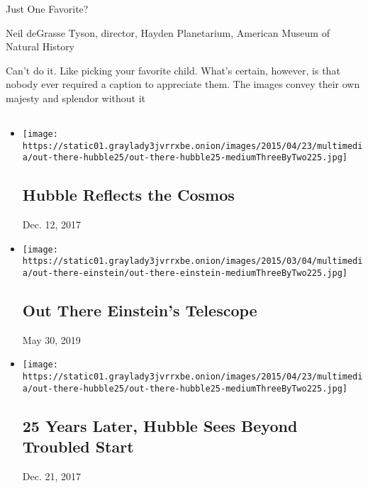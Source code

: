 \begin{enumerate}
  Just One Favorite?

  Neil deGrasse Tyson, director, Hayden Planetarium, American Museum of
  Natural History

  Can't do it. Like picking your favorite child. What's certain,
  however, is that nobody ever required a caption to appreciate them.
  The images convey their own majesty and splendor without it
\end{enumerate}

\subsection{}

\begin{itemize}
\item
  \href{https://www.nytimes3xbfgragh.onion/video/science/100000003647066/hubble-reflects-the-cosmos.html}{}

  \texttt{[image: https://static01.graylady3jvrrxbe.onion/images/2015/04/23/multimedia/out-there-hubble25/out-there-hubble25-mediumThreeByTwo225.jpg]}

  \hypertarget{hubble-reflects-the-cosmos}{%
  \subsection{Hubble Reflects the
  Cosmos}\label{hubble-reflects-the-cosmos}}

  Dec. 12, 2017
\item
  \href{https://www.nytimes3xbfgragh.onion/video/science/100000003552687/out-there-einsteins-telescope.html}{}

  \texttt{[image: https://static01.graylady3jvrrxbe.onion/images/2015/03/04/multimedia/out-there-einstein/out-there-einstein-mediumThreeByTwo225.jpg]}

  \hypertarget{out-there--einsteins-telescope}{%
  \subsection{Out There \textbar{} Einstein's
  Telescope}\label{out-there--einsteins-telescope}}

  May 30, 2019
\item
  \href{https://www.nytimes3xbfgragh.onion/2015/04/24/science/25-years-later-hubble-sees-beyond-troubled-start.html}{}

  \texttt{[image: https://static01.graylady3jvrrxbe.onion/images/2015/04/23/multimedia/out-there-hubble25/out-there-hubble25-mediumThreeByTwo225.jpg]}

  \hypertarget{25-years-later-hubble-sees-beyond-troubled-start}{%
  \subsection{25 Years Later, Hubble Sees Beyond Troubled
  Start}\label{25-years-later-hubble-sees-beyond-troubled-start}}

  Dec. 21, 2017
\end{itemize}

